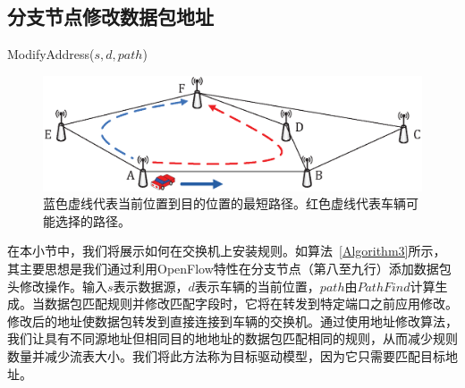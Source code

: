 \subsection{分支节点修改数据包地址} \label{Modify address}

\begin{algorithm}[t]
\caption{ModifyAddress($s,d,path$)}
\label{Algorithm3}
\begin{algorithmic}[1]

\end{algorithmic}
\end{algorithm}


\begin{figure} [t]
\begin{center}
\includegraphics[width=0.9\columnwidth]{figures/fig-5-31.eps}
\caption{蓝色虚线代表当前位置到目的位置的最短路径。红色虚线代表车辆可能选择的路径。} \label{fig5}
\end{center}
\end{figure}

在本小节中，我们将展示如何在交换机上安装规则。如算法~\ref{Algorithm3}所示，其主要思想是我们通过利用OpenFlow特性在分支节点（第八至九行）添加数据包头修改操作。输入$s$表示数据源，$d$表示车辆的当前位置，$path$由$PathFind$计算生成。当数据包匹配规则并修改匹配字段时，它将在转发到特定端口之前应用修改。修改后的地址使数据包转发到直接连接到车辆的交换机。通过使用地址修改算法，我们让具有不同源地址但相同目的地地址的数据包匹配相同的规则，从而减少规则数量并减少流表大小。我们将此方法称为目标驱动模型，因为它只需要匹配目标地址。

